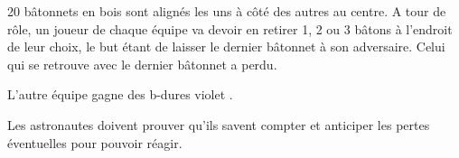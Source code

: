 \documentclass{grand-jeu}
\begin{document}
\begin{liste-materiel}
\end{liste-materiel}

\begin{regles}
20 bâtonnets en bois sont alignés les uns à côté des autres au centre. A tour de rôle, un joueur de chaque équipe va devoir en retirer 1, 2 ou 3 bâtons à l'endroit de leur choix, le but étant de laisser le dernier bâtonnet à son adversaire. Celui qui se retrouve avec le dernier bâtonnet a perdu.

L'autre équipe gagne des b-dures violet . 
\end{regles}

\begin{imaginaire}
Les astronautes doivent prouver qu'ils savent compter et anticiper les pertes éventuelles pour pouvoir réagir.
\end{imaginaire}

\begin{moments-stop}
\end{moments-stop}
\end{document}

